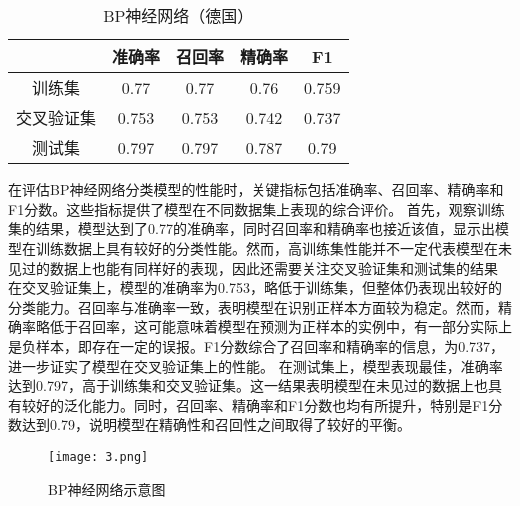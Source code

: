 \documentclass[12pt,a4paper]{nmmcm}
\begin{document}
\\
\\
\begin{table}[h]
    \centering
    \caption{BP神经网络（德国）}
\begin{tabular}{ccccc}
 \hline
      & 准确率   & 召回率   & 精确率   & F1    \\
       \hline
训练集   & 0.77  & 0.77  & 0.76  & 0.759 \\
交叉验证集 & 0.753 & 0.753 & 0.742 & 0.737 \\
测试集   & 0.797 & 0.797 & 0.787 & 0.79 \\
 \hline
 
\end{tabular}
\end{table}
\vspace{1cm}    在评估BP神经网络分类模型的性能时，关键指标包括准确率、召回率、精确率和F1分数。这些指标提供了模型在不同数据集上表现的综合评价。 首先，观察训练集的结果，模型达到了0.77的准确率，同时召回率和精确率也接近该值，显示出模型在训练数据上具有较好的分类性能。然而，高训练集性能并不一定代表模型在未见过的数据上也能有同样好的表现，因此还需要关注交叉验证集和测试集的结果 在交叉验证集上，模型的准确率为0.753，略低于训练集，但整体仍表现出较好的分类能力。召回率与准确率一致，表明模型在识别正样本方面较为稳定。然而，精确率略低于召回率，这可能意味着模型在预测为正样本的实例中，有一部分实际上是负样本，即存在一定的误报。F1分数综合了召回率和精确率的信息，为0.737，进一步证实了模型在交叉验证集上的性能。 在测试集上，模型表现最佳，准确率达到0.797，高于训练集和交叉验证集。这一结果表明模型在未见过的数据上也具有较好的泛化能力。同时，召回率、精确率和F1分数也均有所提升，特别是F1分数达到0.79，说明模型在精确性和召回性之间取得了较好的平衡。 
\\
\begin{figure}[H]
    \centering
    \texttt{[image: 3.png]}
    \caption{BP神经网络示意图}
    \label{fig:enter-label}
\end{figure}
\end{document}
